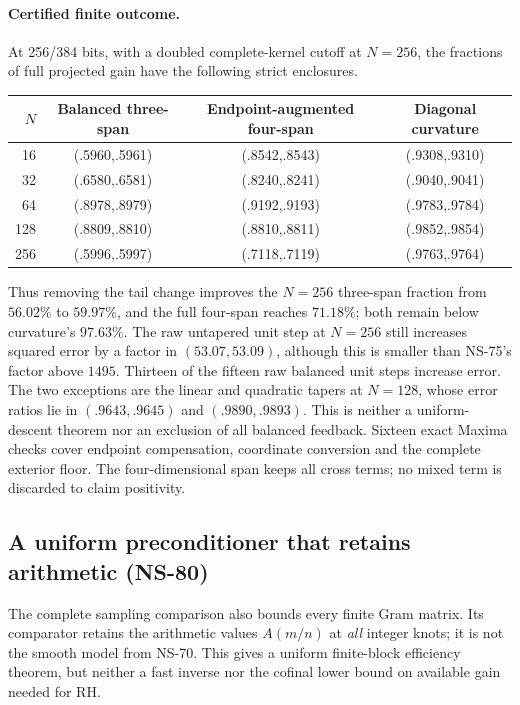 \documentclass[11pt]{article}
\theoremstyle{remark}
\begin{document}
\paragraph{Certified finite outcome.}
At 256/384 bits, with a doubled complete-kernel cutoff at $N=256$,
the fractions of full projected gain have the following strict enclosures.
\begin{center}
\begin{tabular}{rccc}
\hline
$N$&Balanced three-span&Endpoint-augmented four-span&Diagonal curvature\\
\hline
16&(.5960,.5961)&(.8542,.8543)&(.9308,.9310)\\
32&(.6580,.6581)&(.8240,.8241)&(.9040,.9041)\\
64&(.8978,.8979)&(.9192,.9193)&(.9783,.9784)\\
128&(.8809,.8810)&(.8810,.8811)&(.9852,.9854)\\
256&(.5996,.5997)&(.7118,.7119)&(.9763,.9764)\\
\hline
\end{tabular}
\end{center}
Thus removing the tail change improves the $N=256$ three-span fraction
from $56.02\%$ to $59.97\%$, and the full four-span reaches $71.18\%$;
both remain below curvature's $97.63\%$. The raw untapered unit step
at $N=256$ still increases squared error by a factor in $(53.07,53.09)$,
although this is smaller than NS-75's factor above $1495$.
Thirteen of the fifteen raw balanced unit steps increase error. The two
exceptions are the linear and quadratic tapers at $N=128$, whose error
ratios lie in $(.9643,.9645)$ and $(.9890,.9893)$. This is neither a
uniform-descent theorem nor an exclusion of all balanced feedback.
Sixteen exact Maxima checks cover endpoint compensation, coordinate
conversion and the complete exterior floor. The four-dimensional span
keeps all cross terms; no mixed term is discarded to claim positivity.

\subsection{A uniform preconditioner that retains arithmetic (NS-80)}
\label{sec:ns80-arithmetic-preconditioner}

The complete sampling comparison also bounds every finite Gram matrix.
Its comparator retains the arithmetic values $A(m/n)$ at \emph{all}
integer knots; it is not the smooth model from NS-70. This gives a
uniform finite-block efficiency theorem, but neither a fast inverse
nor the cofinal lower bound on available gain needed for RH.
\end{document}
